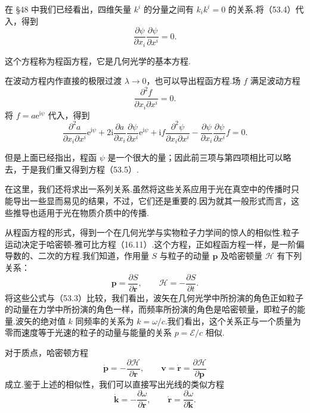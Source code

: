 在 §48 中我们已经看出，四维矢量 $k^i$ 的分量之间有 $k_ik^i=0$ 的关系.将（53.4）代入，得到
\begin{equation}
  \frac{\partial\psi}{\partial x_i}\frac{\partial\psi}{\partial x^i}=0.
\end{equation}

这个方程称为程函方程，它是几何光学的基本方程.

在波动方程内作直接的极限过渡 $\lambda\to 0$，也可以导出程函方程.场 $f$ 满足波动方程
\begin{equation*}
  \frac{\partial^2 f}{\partial x_i\partial x^i}=0.
\end{equation*}
将 $f=a\mathrm{e}^{\mathrm{i}\psi}$ 代入，得到
\begin{equation}
  \frac{\partial^2 a}{\partial x_i\partial x^i}\mathrm{e}^{\mathrm{i}\psi}
  +2\mathrm{i}\frac{\partial a}{\partial x_i}\frac{\partial\psi}{\partial x^i}\mathrm{e}^{\mathrm{i}\psi}
  +\mathrm{i}f\frac{\partial^2\psi}{\partial x_i\partial x^i}
  -\frac{\partial\psi}{\partial x_i}\frac{\partial\psi}{\partial x^i}f=0.
\end{equation}

但是上面已经指出，程函 $\psi$ 是一个很大的量；因此前三项与第四项相比可以略去，于是我们重又得到方程（53.5）.

在这里，我们还将求出一系列关系.虽然将这些关系应用于光在真空中的传播时只能导出一些显而易见的结果，不过，它们还是重要的.因为就其一般形式而言，这些推导也适用于光在物质介质中的传播.

从程函方程的形式，得到一个在几何光学与实物粒子力学间的惊人的相似性.粒子运动决定于哈密顿-雅可比方程（16.11）.这个方程，正如程函方程一样，是一阶偏导数的、二次的方程.我们知道，作用量 $S$ 与粒子的动量 $\boldsymbol{p}$ 及哈密顿量 $\mathcal{H}$ 有下列关系：
\begin{equation*}
  \boldsymbol{p}=\frac{\partial S}{\partial\boldsymbol{r}},\qquad
  \mathcal{H}=-\frac{\partial S}{\partial t}.
\end{equation*}
将这些公式与（53.3）比较，我们看出，波矢在几何光学中所扮演的角色正如粒子的动量在力学中所扮演的角色一样，而频率所扮演的角色是哈密顿量，即粒子的能量.波矢的绝对值 $k$ 同频率的关系为 $k=\omega/c$.我们看出，这个关系正与一个质量为零而速度等于光速的粒子的动量与能量的关系 $p=\mathcal{E}/c$ 相似.

对于质点，哈密顿方程
\begin{equation*}
  \dot{\boldsymbol{p}}=-\frac{\partial\mathcal{H}}{\partial\boldsymbol{r}},\qquad
  \boldsymbol{v}=\dot{\boldsymbol{r}}=\frac{\partial\mathcal{H}}{\partial\boldsymbol{p}}
\end{equation*}
成立.鉴于上述的相似性，我们可以直接写出光线的类似方程
\begin{equation}
  \dot{\boldsymbol{k}}=-\frac{\partial\omega}{\partial\boldsymbol{r}},\qquad
  \dot{\boldsymbol{r}}=\frac{\partial\omega}{\partial\boldsymbol{k}}.
\end{equation}

